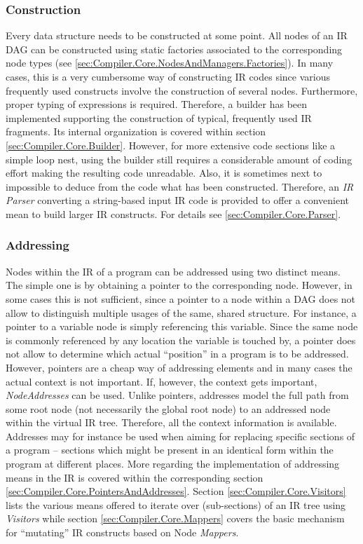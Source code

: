 \subsubsection{Construction}
Every data structure needs to be constructed at some point. All nodes of an IR
DAG can be constructed using static factories associated to the corresponding
node types (see \ref{sec:Compiler.Core.NodesAndManagers.Factories}). In many
cases, this is a very cumbersome way of constructing IR codes since various
frequently used constructs involve the construction of several nodes.
Furthermore, proper typing of expressions is required. Therefore, a builder has
been implemented supporting the construction of typical, frequently used IR
fragments. Its internal organization is covered within section
\ref{sec:Compiler.Core.Builder}. However, for more extensive code sections like
a simple loop nest, using the builder still requires a considerable amount of
coding effort making the resulting code unreadable. Also, it is sometimes next
to impossible to deduce from the code what has been constructed. Therefore, an
\textit{IR Parser} converting a string-based input IR code is provided to offer
a convenient mean to build larger IR constructs. For details see
\ref{sec:Compiler.Core.Parser}.

\subsubsection{Addressing}
Nodes within the IR of a program can be addressed using two distinct means. The
simple one is by obtaining a pointer to the corresponding node. However, in some
cases this is not sufficient, since a pointer to a node within a DAG does not
allow to distinguish multiple usages of the same, shared structure. For
instance, a pointer to a variable node is simply referencing this variable.
Since the same node is commonly referenced by any location the variable is
touched by, a pointer does not allow to determine which actual ``position'' in a
program is to be addressed. However, pointers are a cheap way of addressing
elements and in many cases the actual context is not important. If, however, the
context gets important, \textit{NodeAddresses} can be used. Unlike pointers,
addresses model the full path from some root node (not necessarily the global
root node) to an addressed node within the virtual IR tree. Therefore, all the
context information is available. Addresses may for instance be used when aiming
for replacing specific sections of a program -- sections which might be present
in an identical form within the program at different places. More regarding the
implementation of addressing means in the IR is covered within the corresponding
section \ref{sec:Compiler.Core.PointersAndAddresses}. Section
\ref{sec:Compiler.Core.Visitors} lists the various means offered to iterate over
(sub-sections) of an IR tree using \textit{Visitors} while section
\ref{sec:Compiler.Core.Mappers} covers the basic mechanism for ``mutating'' IR
constructs based on Node \textit{Mappers}.

